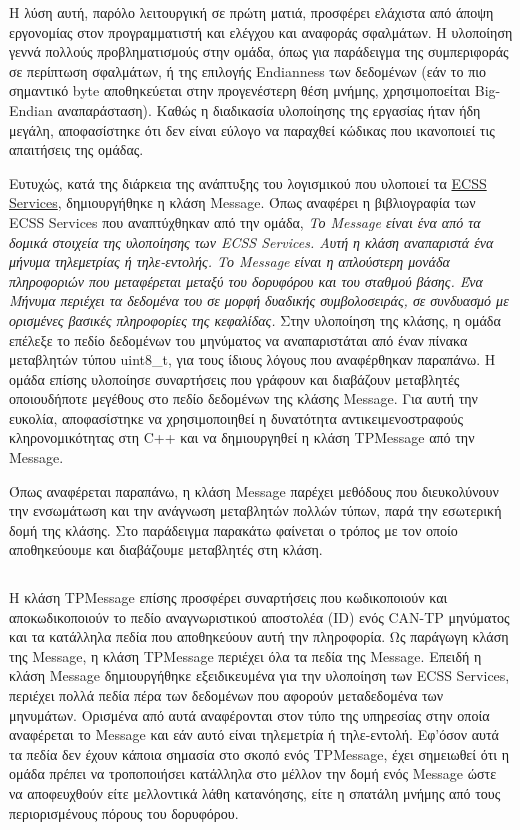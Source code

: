 \documentclass[a4paper,nobib,justified]{tufte-book}
\begin{document}
\inputminted{cpp}{code/examples/stuffInVector.cpp}

Η λύση αυτή, παρόλο λειτουργική σε πρώτη ματιά, προσφέρει ελάχιστα από άποψη εργονομίας στον προγραμματιστή και ελέγχου και αναφοράς σφαλμάτων. Η υλοποίηση γεννά πολλούς προβληματισμούς στην ομάδα, όπως για παράδειγμα της συμπεριφοράς σε περίπτωση σφαλμάτων, ή της επιλογής Endianness των δεδομένων (εάν το πιο σημαντικό byte αποθηκεύεται στην προγενέστερη θέση μνήμης, χρησιμοποείται Big-Endian αναπαράσταση). Καθώς η διαδικασία υλοποίησης της εργασίας ήταν ήδη μεγάλη, αποφασίστηκε ότι δεν είναι εύλογο να παραχθεί κώδικας που ικανοποιεί τις απαιτήσεις της ομάδας.

Ευτυχώς, κατά της διάρκεια της ανάπτυξης του λογισμικού που υλοποιεί τα \href{https://gitlab.com/acubesat/obc/ecss-services}{ECSS Services}, δημιουργήθηκε η κλάση Message. Όπως αναφέρει η βιβλιογραφία των ECSS Services που αναπτύχθηκαν από την ομάδα, \textit{Το Message είναι ένα από τα δομικά στοιχεία της υλοποίησης των ECSS Services. Αυτή η κλάση αναπαριστά ένα μήνυμα τηλεμετρίας ή τηλε-εντολής. Το Message είναι η απλούστερη μονάδα πληροφοριών που μεταφέρεται μεταξύ του δορυφόρου και του σταθμού βάσης. Ένα Μήνυμα περιέχει τα δεδομένα του σε μορφή δυαδικής συμβολοσειράς, σε συνδυασμό με ορισμένες βασικές πληροφορίες της κεφαλίδας.} Στην υλοποίηση της κλάσης, η ομάδα επέλεξε το πεδίο δεδομένων του μηνύματος να αναπαριστάται από έναν πίνακα μεταβλητών τύπου uint8\_t, για τους ίδιους λόγους που αναφέρθηκαν παραπάνω. Η ομάδα επίσης υλοποίησε συναρτήσεις που γράφουν και διαβάζουν μεταβλητές οποιουδήποτε μεγέθους στο πεδίο δεδομένων της κλάσης Message. Για αυτή την ευκολία, αποφασίστηκε να χρησιμοποιηθεί η δυνατότητα αντικειμενοστραφούς κληρονομικότητας στη C++ και να δημιουργηθεί η κλάση TPMessage από την Message.

Όπως αναφέρεται παραπάνω, η κλάση Message παρέχει μεθόδους που διευκολύνουν την ενσωμάτωση και την ανάγνωση μεταβλητών πολλών τύπων, παρά την εσωτερική δομή της κλάσης. Στο παράδειγμα παρακάτω φαίνεται ο τρόπος με τον οποίο αποθηκεύουμε και διαβάζουμε μεταβλητές στη κλάση.
\inputminted{cpp}{code/examples/ecss-message-usage.cpp}

Η κλάση TPMessage επίσης προσφέρει συναρτήσεις που κωδικοποιούν και αποκωδικοποιούν το πεδίο αναγνωριστικού αποστολέα (ID) ενός CAN-TP μηνύματος και τα κατάλληλα πεδία που αποθηκεύουν αυτή την πληροφορία. Ως παράγωγη κλάση της Message, η κλάση TPMessage περιέχει όλα τα πεδία της Message. Επειδή η κλάση Message δημιουργήθηκε εξειδικευμένα για την υλοποίηση των ECSS Services, περιέχει πολλά πεδία πέρα των δεδομένων που αφορούν μεταδεδομένα των μηνυμάτων. Ορισμένα από αυτά αναφέρονται στον τύπο της υπηρεσίας στην οποία αναφέρεται το Message και εάν αυτό είναι τηλεμετρία ή τηλε-εντολή. Εφ'όσον αυτά τα πεδία δεν έχουν κάποια σημασία στο σκοπό ενός TPMessage, έχει σημειωθεί ότι η ομάδα πρέπει να τροποποιήσει κατάλληλα στο μέλλον την δομή ενός Message ώστε να αποφευχθούν είτε μελλοντικά λάθη κατανόησης, είτε η σπατάλη μνήμης από τους περιορισμένους πόρους του δορυφόρου. 
\end{document}
